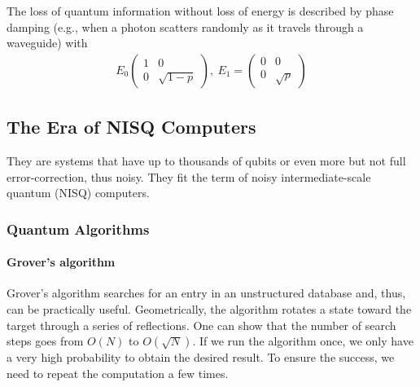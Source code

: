 The loss of quantum information without loss of energy is described by phase damping (e.g., when a photon scatters randomly as it travels through a waveguide) with
\begin{align*}
    E_0\begin{pmatrix}
        1 & 0\\ 0& \sqrt{1-p}
    \end{pmatrix},\ E_1=\begin{pmatrix}
        0 & 0\\  0 & \sqrt{p}
    \end{pmatrix}
\end{align*}

\subsection{The Era of NISQ Computers}
They are systems that have up to thousands of qubits or even more but not full error-correction, thus noisy. They fit the term of noisy intermediate-scale quantum (NISQ) computers.

\subsubsection{Quantum Algorithms}
\paragraph{Grover's algorithm}
Grover’s algorithm searches for an entry in an unstructured database and, thus, can be practically useful. Geometrically, the algorithm rotates a state toward the target through a series of reﬂections. One can show that the number of search steps goes from $O(N)$ to $O(\sqrt{N})$. If we run the algorithm once, we only have a very high probability to obtain the desired result. To ensure the success, we need to repeat the computation a few times.

\begin{figure}[htb]
    \centering
\end{figure}

